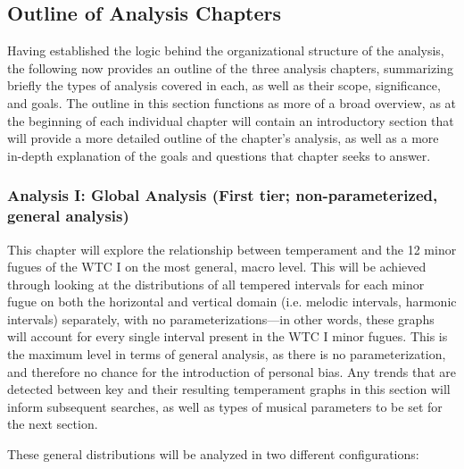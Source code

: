     \subsection{Outline of Analysis
Chapters}\label{outline-of-analysis-chapters}

Having established the logic behind the organizational structure of the
analysis, the following now provides an outline of the three analysis
chapters, summarizing briefly the types of analysis covered in each, as
well as their scope, significance, and goals. The outline in this
section functions as more of a broad overview, as at the beginning of
each individual chapter will contain an introductory section that will
provide a more detailed outline of the chapter's analysis, as well as a
more in-depth explanation of the goals and questions that chapter seeks
to answer.

\subsubsection{Analysis I: Global Analysis (First tier;
non-parameterized, general
analysis)}\label{analysis-i-global-analysis-first-tier-non-parameterized-general-analysis}

This chapter will explore the relationship between temperament and the
12 minor fugues of the WTC I on the most general, macro level. This will
be achieved through looking at the distributions of all tempered
intervals for each minor fugue on both the horizontal and vertical
domain (i.e. melodic intervals, harmonic intervals) separately, with no
parameterizations---in other words, these graphs will account for
every single interval present in the WTC I minor fugues. This is the
maximum level in terms of general analysis, as there is no
parameterization, and therefore no chance for the introduction of
personal bias. Any trends that are detected between key and their
resulting temperament graphs in this section will inform subsequent
searches, as well as types of musical parameters to be set for the next
section.

These general distributions will be analyzed in two different
configurations:

